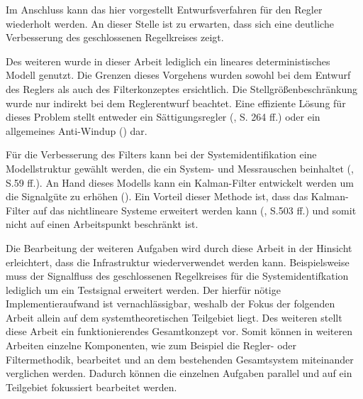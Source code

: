 Im Anschluss kann das hier vorgestellt Entwurfsverfahren für den Regler wiederholt werden. An dieser Stelle ist zu erwarten, dass sich eine deutliche Verbesserung des geschlossenen Regelkreises zeigt. 

Des weiteren wurde in dieser Arbeit lediglich ein lineares deterministisches Modell genutzt. Die Grenzen dieses Vorgehens wurden sowohl bei dem Entwurf des Reglers als auch des Filterkonzeptes ersichtlich. Die Stellgrößenbeschränkung wurde nur indirekt bei dem Reglerentwurf beachtet. Eine effiziente Lösung für dieses Problem stellt entweder ein Sättigungsregler (\cite{AdamyNL}, S. 264 ff.)  oder ein allgemeines Anti-Windup (\cite{Ortseifen}) dar.

Für die Verbesserung des Filters kann bei der Systemidentifikation eine Modellstruktur gewählt werden, die ein System- und Messrauschen beinhaltet (\cite{UnbehauenSysId}, S.59 ff.). An Hand dieses Modells kann ein Kalman-Filter entwickelt werden um die Signalgüte zu erhöhen (\cite{KalmanFilter}). Ein Vorteil dieser Methode ist, dass das Kalman-Filter auf das nichtlineare Systeme erweitert werden kann (\cite{AdamyNL}, S.503 ff.) und somit nicht auf einen Arbeitspunkt beschränkt ist.

Die Bearbeitung der weiteren Aufgaben wird durch diese Arbeit in der Hinsicht erleichtert, dass die Infrastruktur wiederverwendet werden kann. Beispielsweise muss der Signalfluss des geschlossenen Regelkreises für die Systemidentifkation lediglich um ein Testsignal erweitert werden. Der hierfür nötige Implementieraufwand ist vernachlässigbar, weshalb der Fokus der folgenden Arbeit allein auf dem systemtheoretischen Teilgebiet liegt. Des weiteren stellt diese Arbeit ein funktionierendes Gesamtkonzept vor. Somit können in weiteren Arbeiten einzelne Komponenten, wie zum Beispiel die Regler- oder Filtermethodik, bearbeitet und an dem bestehenden Gesamtsystem miteinander verglichen werden. Dadurch können die einzelnen Aufgaben parallel und auf ein Teilgebiet fokussiert bearbeitet werden.